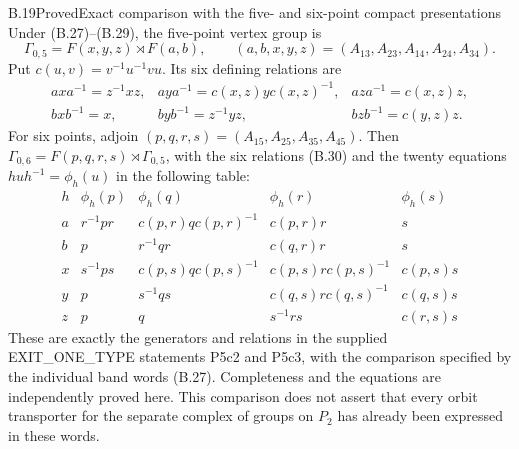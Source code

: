 \begin{result}{B.19}{Proved}{Exact comparison with the five- and six-point compact presentations}
Under (B.27)--(B.29), the five-point vertex group is
\[
 \Gamma_{0,5}=F(x,y,z)\rtimes F(a,b),
 \qquad (a,b,x,y,z)=(A_{13},A_{23},A_{14},A_{24},A_{34}).
\]
Put $c(u,v)=v^{-1}u^{-1}vu$.  Its six defining relations are
\[
\begin{array}{lll}
 axa^{-1}=z^{-1}xz,&
 aya^{-1}=c(x,z)y c(x,z)^{-1},&
 aza^{-1}=c(x,z)z,\\
 bxb^{-1}=x,&
 byb^{-1}=z^{-1}yz,&
 bzb^{-1}=c(y,z)z.
\end{array}                                                   \tag{B.30}
\]
For six points, adjoin
$(p,q,r,s)=(A_{15},A_{25},A_{35},A_{45})$.
Then $\Gamma_{0,6}=F(p,q,r,s)\rtimes\Gamma_{0,5}$, with the six
relations (B.30) and the twenty equations
$huh^{-1}=\phi_h(u)$ in the following table:
\begingroup\small\setlength{\arraycolsep}{3pt}
\[
\begin{array}{c|cccc}
 h&\phi_h(p)&\phi_h(q)&\phi_h(r)&\phi_h(s)\\\hline
 a&r^{-1}pr&c(p,r)q c(p,r)^{-1}&c(p,r)r&s\\
 b&p&r^{-1}qr&c(q,r)r&s\\
 x&s^{-1}ps&c(p,s)q c(p,s)^{-1}&c(p,s)r c(p,s)^{-1}&c(p,s)s\\
 y&p&s^{-1}qs&c(q,s)r c(q,s)^{-1}&c(q,s)s\\
 z&p&q&s^{-1}rs&c(r,s)s
\end{array}                                                   \tag{B.31}
\]
\endgroup
These are exactly the generators and relations in the supplied
EXIT\_ONE\_TYPE statements P5c2 and P5c3, with the comparison
specified by the individual band words (B.27).  Completeness
and the equations are independently proved here.  This comparison
does not assert that every orbit transporter for the separate
complex of groups on $P_2$ has already been expressed in these
words.
\end{result}
